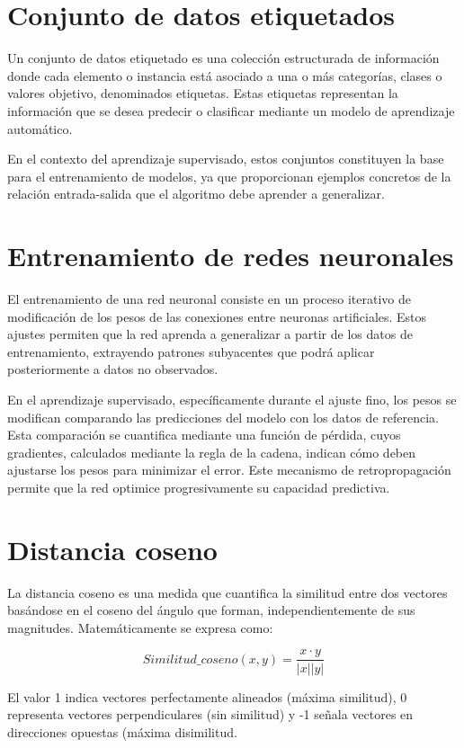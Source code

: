 \section{Conjunto de datos etiquetados}
\label{anexo:datos_et}
Un conjunto de datos etiquetado es una colección estructurada de información donde cada elemento o instancia está asociado a una o más categorías, clases o valores objetivo, denominados etiquetas. Estas etiquetas representan la información que se desea predecir o clasificar mediante un modelo de aprendizaje automático.

En el contexto del aprendizaje supervisado, estos conjuntos constituyen la base para el entrenamiento de modelos, ya que proporcionan ejemplos concretos de la relación entrada-salida que el algoritmo debe aprender a generalizar.



\section{Entrenamiento de redes neuronales}
\label{anexo:entrenamiento}
El entrenamiento de una red neuronal consiste en un proceso iterativo de modificación de los pesos de las conexiones entre neuronas artificiales. Estos ajustes permiten que la red aprenda a generalizar a partir de los datos de entrenamiento, extrayendo patrones subyacentes que podrá aplicar posteriormente a datos no observados.

En el aprendizaje supervisado, específicamente durante el ajuste fino, los pesos se modifican comparando las predicciones del modelo con los datos de referencia. Esta comparación se cuantifica mediante una función de pérdida, cuyos gradientes, calculados mediante la regla de la cadena, indican cómo deben ajustarse los pesos para minimizar el error. Este mecanismo de retropropagación permite que la red optimice progresivamente su capacidad predictiva.

\section{Distancia coseno}
\label{anexo:dis_cos}
La distancia coseno es una medida que cuantifica la similitud entre dos vectores basándose en el coseno del ángulo que forman, independientemente de sus magnitudes. Matemáticamente se expresa como: 

\[Similitud\_coseno(x,y) = \frac{x \cdot y}{|x||y|}\]

El valor 1 indica vectores perfectamente alineados (máxima similitud), 0 representa vectores perpendiculares (sin similitud) y -1 señala vectores en direcciones opuestas (máxima disimilitud.

